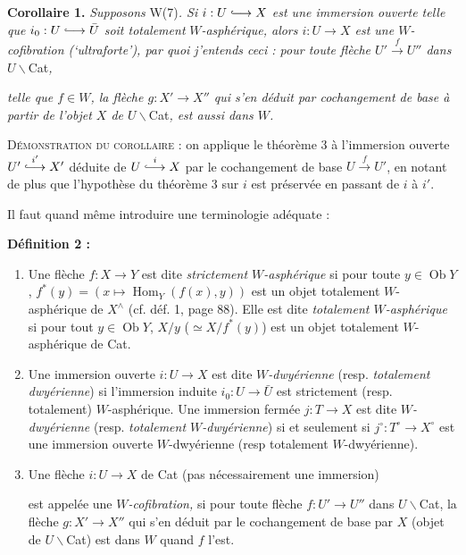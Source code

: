 \documentclass[11pt]{article}
\newcommand{\printedpage}[1]{\marginpar{\footnotesize p.~#1}}
\newcommand{\msp}[1]{\marginpar{\footnotesize [#1]}}
\newcommand{\hra}{\lhook\joinrel\longrightarrow}
\begin{document}
\textbf{Corollaire 1.} \textit{Supposons} W(7)\textit{. Si $i:U\hra X$ est une immersion ouverte telle que $i_0:U\hra\bar{U}$ soit totalement} \textit{$W$-asphérique, alors $i:U\longrightarrow X$ est une $W$-cofibration (`ultraforte'), par quoi j'entends ceci : pour toute flèche $U'\xrightarrow{f}U''$ dans $U\backslash$}Cat\textit{,}

\msp{page 109}

\textit{telle que $f\in W$, la flèche $g:X'\longrightarrow X''$ qui s'en déduit par cochangement de base à partir de l'objet $X$ de $U\backslash$}Cat\textit{, est aussi dans $W$.}

\textsc{Démonstration du corollaire} : on applique le théorème 3 à l'immersion ouverte $U'\overset{i'}{\hra}X'$ déduite de $U\overset{i}{\hra}X$ par le cochangement de base $U\xrightarrow{f}U'$, en notant de plus que l'hypothèse du théorème 3 sur $i$ est préservée en passant de $i$ à $i'$.

Il faut quand même introduire une terminologie adéquate :

\textbf{Définition 2 :}

\begin{enumerate}[label=\alph*)]
\item Une flèche $f:X\longrightarrow Y$ est dite \textit{strictement $W$-asphérique} si pour toute $y\in\operatorname{Ob}Y$, $f^*(y)=(x\longmapsto\operatorname{Hom}_Y(f(x),y))$ est un objet totalement $W$-asphérique de $X^\wedge$ (cf. déf. 1, page 88). Elle est dite \textit{totalement $W$-asphérique} si pour tout $y\in\operatorname{Ob}Y$, $X/y$ ($\simeq X/f^*(y)$) est un objet totalement $W$-asphérique de Cat.

\item \printedpage{76}
Une immersion ouverte $i:U\longrightarrow X$ est dite \textit{$W$-dwyérienne} (resp. \textit{totalement} \textit{dwyérienne}) si l'immersion induite $i_0:U\longrightarrow\bar{U}$ est strictement (resp. totalement) $W$-asphérique. Une immersion fermée $j:T\longrightarrow X$ est dite \textit{$W$-dwyérienne} (resp. \textit{totalement $W$-dwyérienne}) si et seulement si $j^\circ:T^\circ\longrightarrow X^\circ$ est une immersion ouverte $W$-dwyérienne (resp totalement $W$-dwyérienne).

\item Une flèche $i:U\longrightarrow X$ de Cat (pas nécessairement une immersion)

\msp{page 110}

est appelée une \textit{$W$-cofibration,} si pour toute flèche $f:U'\longrightarrow U''$ dans $U\backslash$Cat, la flèche $g:X'\longrightarrow X''$ qui s'en déduit par le cochangement de base par $X$ (objet de $U\backslash$Cat) est dans $W$ quand $f$ l'est.
\end{enumerate}
\end{document}
